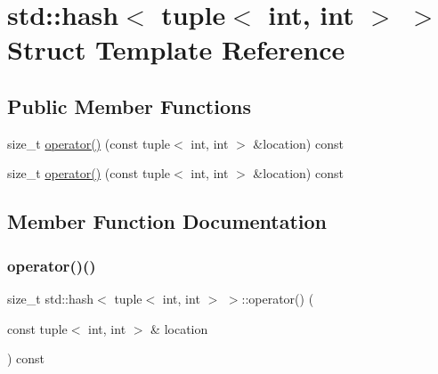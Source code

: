 \hypertarget{structstd_1_1hash_3_01tuple_3_01int_00_01int_01_4_01_4}{}\section{std\+:\+:hash$<$ tuple$<$ int, int $>$ $>$ Struct Template Reference}
\label{structstd_1_1hash_3_01tuple_3_01int_00_01int_01_4_01_4}
\subsection*{Public Member Functions}
\begin{DoxyCompactItemize}
\item 
size\+\_\+t \mbox{\hyperlink{structstd_1_1hash_3_01tuple_3_01int_00_01int_01_4_01_4_af46854ec2c5aa6cd6d1cd164374bd54f}{operator()}} (const tuple$<$ int, int $>$ \&location) const
\item 
size\+\_\+t \mbox{\hyperlink{structstd_1_1hash_3_01tuple_3_01int_00_01int_01_4_01_4_af46854ec2c5aa6cd6d1cd164374bd54f}{operator()}} (const tuple$<$ int, int $>$ \&location) const
\end{DoxyCompactItemize}


\subsection{Member Function Documentation}
\mbox{\label{structstd_1_1hash_3_01tuple_3_01int_00_01int_01_4_01_4_af46854ec2c5aa6cd6d1cd164374bd54f}} 
\subsubsection{\texorpdfstring{operator()()}{operator()()}\hspace{0.1cm}{\footnotesize\ttfamily [1/2]}}
{\footnotesize\ttfamily size\+\_\+t std\+::hash$<$ tuple$<$ int, int $>$ $>$\+::operator() (\begin{DoxyParamCaption}\item[{const tuple$<$ int, int $>$ \&}]{location }\end{DoxyParamCaption}) const\hspace{0.3cm}{\ttfamily [inline]}}

